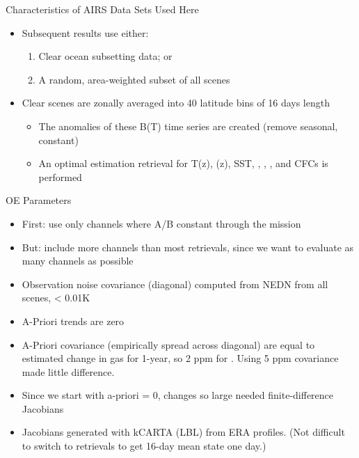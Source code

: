 \documentclass[10pt,t]{beamer}
\begin{document}
\begin{frame}[label={sec:orgbc9f3c2},shrink=20]{Characteristics of AIRS Data Sets Used Here}
\begin{itemize}
\item Subsequent results use either:
\begin{enumerate}
\item Clear ocean subsetting data; or
\item A random, area-weighted subset of all scenes
\end{enumerate}
\item Clear scenes are zonally averaged into 40 latitude bins of 16 days length
\begin{itemize}
\item The anomalies of these B(T) time series are created (remove seasonal, constant)
\item An optimal estimation retrieval for T(z), \water(z), SST, \cd, \methane, \nitrous, and CFCs is performed
\end{itemize}
\end{itemize}

\begin{block}{OE Parameters}
\begin{itemize}
\item First: use only channels where A/B constant through the mission
\item But: include more channels than most retrievals, since we want to evaluate as many channels as possible
\item Observation noise covariance (diagonal) computed from NEDN from all scenes, < 0.01K
\item A-Priori trends are zero
\item A-Priori covariance (empirically spread across diagonal) are equal to estimated change in gas for 1-year, so 2 ppm for \cd.  Using 5 ppm covariance made little difference.
\item Since we start with a-priori = 0, \cd changes so large needed finite-difference Jacobians
\item Jacobians generated with kCARTA (LBL) from ERA profiles.  (Not difficult to switch to retrievals to get 16-day mean state one day.)
\end{itemize}
\end{block}
\end{frame}
\end{document}
